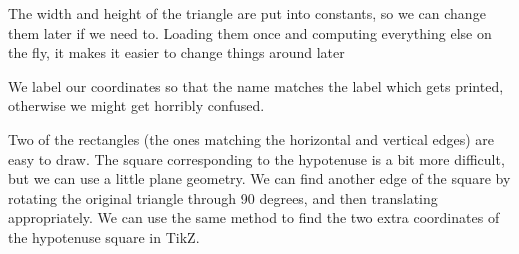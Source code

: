 \documentclass{minimal}
\begin{document}
{

\newcommand\xaxis{210}
\newcommand\yaxis{-30}
\newcommand\zaxis{90}

\newcommand\topside[3]{
  \fill[fill=yellow, draw=black,shift={(\xaxis:#1)},shift={(\yaxis:#2)},
  shift={(\zaxis:#3)}] (0,0) -- (30:1) -- (0,1) --(150:1)--(0,0);
}

\newcommand\leftside[3]{
  \fill[fill=red, draw=black,shift={(\xaxis:#1)},shift={(\yaxis:#2)},
  shift={(\zaxis:#3)}] (0,0) -- (0,-1) -- (210:1) --(150:1)--(0,0);
}

\newcommand\rightside[3]{
  \fill[fill=blue, draw=black,shift={(\xaxis:#1)},shift={(\yaxis:#2)},
  shift={(\zaxis:#3)}] (0,0) -- (30:1) -- (-30:1) --(0,-1)--(0,0);
}

\newcommand\cube[3]{
  \topside{#1}{#2}{#3} \leftside{#1}{#2}{#3} \rightside{#1}{#2}{#3}
}

\newcommand\planepartition[1]{
 \setcounter{x}{-1}
  \foreach \a in {#1} {
    \addtocounter{x}{1}
    \setcounter{y}{-1}
    \foreach \b in \a {
      \addtocounter{y}{1}
      \setcounter{z}{-1}
      \foreach \c in {1,...,\b} {
        \addtocounter{z}{1}
        \cube{\value{x}}{\value{y}}{\value{z}}
      }
    }
  }
}


}


The width and height of the triangle are put into constants, so we can change
them later if we need to. Loading them once and computing everything else on
the fly, it makes it easier to change things around later

We label our coordinates so that the name matches the label which gets printed,
otherwise we might get horribly confused.

Two of the rectangles (the ones matching the horizontal and vertical edges)
are easy to draw. The square corresponding to the hypotenuse is a bit
more difficult, but we can use a little plane geometry. We can find another
edge of the square by rotating the original triangle through 90 degrees,
and then translating appropriately. We can use the same method to find the
two extra coordinates of the hypotenuse square in TikZ.
\end{document}
